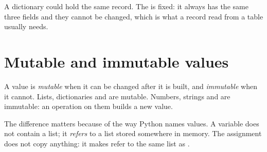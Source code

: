 \label{lst:g10:tuples-sets-comprehensions:named}

\label{out:g10:tuples-sets-comprehensions:named}

A dictionary could hold the same record. The  is fixed: it always has the same three fields and they
cannot be changed, which is what a record read from a table usually needs.

\section{Mutable and immutable values}\label{sec:g10:tuples-sets-comprehensions:mutable}

\begin{definition}\label{def:g10:tuples-sets-comprehensions:mutable}
A value is \emph{mutable} when it can be changed after it is built, and
\emph{immutable} when it cannot. Lists, dictionaries and  are mutable. Numbers, strings and
 are immutable: an operation on them builds a new value.
\end{definition}

\label{lst:g10:tuples-sets-comprehensions:immutable}

\label{out:g10:tuples-sets-comprehensions:immutable}

The difference matters because of the way Python names values. A variable does not contain a list; it
\emph{refers} to a list stored somewhere in memory. The assignment  does not copy anything: it makes
 refer to the same list as .

